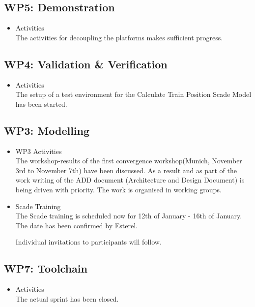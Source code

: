 \documentclass[a4paper, 11pt]{article}
\begin{document}
\subsection{WP5: Demonstration}
\begin{itemize}
\item Activities\\
The activities for decoupling the platforms makes sufficient progress.

\end{itemize}

\subsection{WP4: Validation \& Verification}
\begin{itemize}
\item Activities\\
The setup of a test environment for the Calculate Train Position Scade Model has been started.

\end{itemize}

\subsection{WP3: Modelling}
\begin{itemize}

\item WP3 Activities\\
The workshop-results of the first convergence workshop(Munich, November 3rd to November 7th) have been discussed.
As a result and as part of the work writing of the ADD document (Architecture and Design Document) is being driven with priority.
The work is organised in working groups.

\item Scade Training\\
The Scade training is scheduled now for 12th of January - 16th of January.
The date has been confirmed by Esterel.

Individual invitations to participants will follow.
\end{itemize}

\subsection{WP7: Toolchain}

\begin{itemize}
\item Activities\\
The actual sprint has been closed.
\end{itemize}
\end{document}
